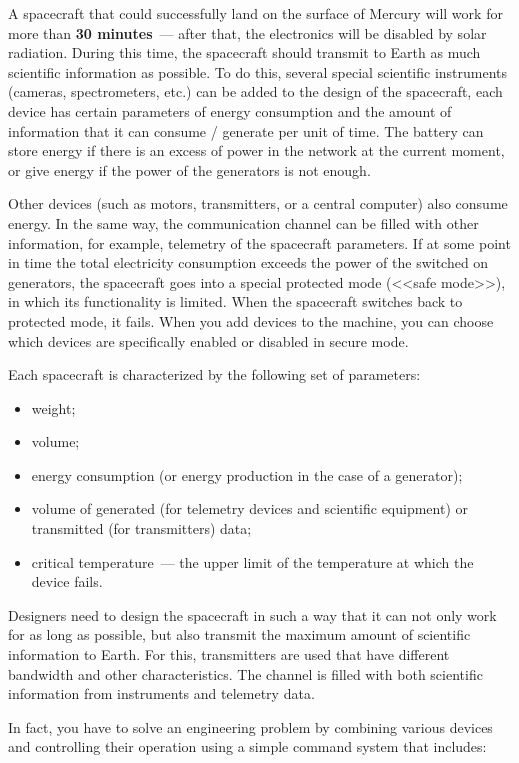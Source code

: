 \documentclass[12pt,a4paper]{article}
\begin{document}
A spacecraft that could successfully land on the surface of Mercury will work for more than \textbf{30 minutes}~--- after that, the electronics will be disabled by solar radiation. During this time, the spacecraft should transmit to Earth as much scientific information as possible. To do this, several special scientific instruments (cameras, spectrometers, etc.) can be added to the design of the spacecraft, each device has certain parameters of energy consumption and the amount of information that it can consume / generate per unit of time. The battery can store energy if there is an excess of power in the network at the current moment, or give energy if the power of the generators is not enough.

Other devices (such as motors, transmitters, or a central computer) also consume energy. In the same way, the communication channel can be filled with other information, for example, telemetry of the spacecraft parameters. If at some point in time the total electricity consumption exceeds the power of the switched on generators, the spacecraft goes into a special protected mode (<<safe mode>>), in which its functionality is limited. When the spacecraft switches back to protected mode, it fails. When you add devices to the machine, you can choose which devices are specifically enabled or disabled in secure mode.

Each spacecraft is characterized by the following set of parameters:

\begin{itemize}
\item weight;
\item volume;
\item energy consumption (or energy production in the case of a generator);
\item volume of generated (for telemetry devices and scientific equipment) or transmitted (for transmitters) data;
\item critical temperature~--- the upper limit of the temperature at which the device fails.
\end{itemize}

Designers need to design the spacecraft in such a way that it can not only work for as long as possible, but also transmit the maximum amount of scientific information to Earth. For this, transmitters are used that have different bandwidth and other characteristics. The channel is filled with both scientific information from instruments and
telemetry data.

In fact, you have to solve an engineering problem by combining various devices and controlling their operation using a simple command system that includes:
\end{document}
